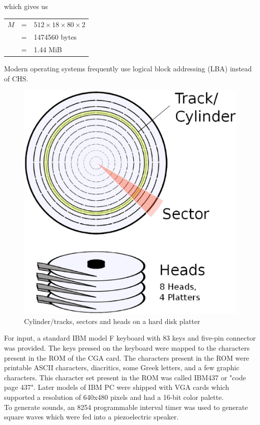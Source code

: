 which gives us
\begin{center}\begin{tabular}{ccl}
$M$ &= &$512 \times 18 \times 80 \times 2$\\
 &= &1474560 bytes\\
 &= &1.44 MiB
\end{tabular}\end{center}
Modern operating systems frequently  use logical block addressing (LBA) instead of CHS.\\
\begin{figure}[h]
  \centering
  \includegraphics[scale=0.25]{figures/chs.eps}
  \caption{Cylinder/tracks, sectors and heads on a hard disk platter \cite{chsdiag}}
\label{fig:chs}
\end{figure}
For input, a standard IBM model F keyboard with 83 keys and five-pin connector was provided. The keys pressed on the keyboard were mapped to the characters present in the ROM of the CGA card. The characters present in the ROM were printable ASCII characters, diacritics, some Greek letters, and a few graphic characters. This character set present in the ROM was called IBM437 or "code page 437". Later models of IBM PC were shipped with VGA cards which supported a resolution of 640x480 pixels and had a 16-bit color palette.\\
To generate sounds, an 8254 programmable interval timer was used to generate square waves which were fed into a piezoelectric speaker.

